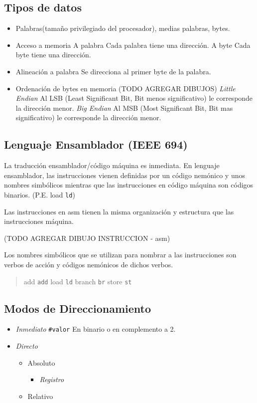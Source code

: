 \documentclass[a4paper,11pt,spanish]{report}
\begin{document}
\subsection{Tipos de datos}
\begin{itemize}
\item Palabras(tamaño privilegiado del procesador), medias palabras, bytes.
\item Acceso a memoria 
\subitem A palabra \textrightarrow Cada palabra tiene una dirección.
\subitem A byte \textrightarrow Cada byte tiene una dirección.
\item Alineación a palabra \textrightarrow Se direcciona al primer byte de la palabra.
\item Ordenación de bytes en memoria
(TODO AGREGAR DIBUJOS)
\subitem \emph{Little Endian} Al LSB (Least Significant Bit, Bit menos significativo) le corresponde la dirección menor.
\subitem \emph{Big Endian} Al MSB (Most Significant Bit, Bit mas significativo) le corresponde la dirección menor.
\end{itemize}

\subsection{Lenguaje Ensamblador (IEEE 694)}
La traducción ensamblador/código máquina es inmediata. En lenguaje ensamblador, las instrucciones vienen definidas por un código nemónico y unos nombres simbólicos mientras que las instrucciones en código máquina son códigos binarios. (P.E. load \textrightarrow \verb|ld|)

Las instrucciones en asm tienen la misma organización y estructura que las instrucciones máquina.

(TODO AGREGAR DIBUJO INSTRUCCION - asm)

Los nombres simbólicos que se utilizan para nombrar a las instrucciones son verbos de acción y códigos nemónicos de dichos verbos.
\begin{quote}
add \textrightarrow \verb|add|	load \textrightarrow \verb|ld|
branch \textrightarrow \verb|br|	store \textrightarrow \verb|st|
\end{quote}
 
\subsection{Modos de Direccionamiento}
\begin{itemize}
\item \emph{Inmediato} \verb|#valor| \textrightarrow En binario o en complemento a 2.
\item \emph{Directo} 
	\begin{itemize}
	\item Absoluto
		\begin{itemize}
			\item \emph{Registro}
		\end{itemize}
	\item Relativo
	\end{itemize}

\end{itemize}
\end{document}
